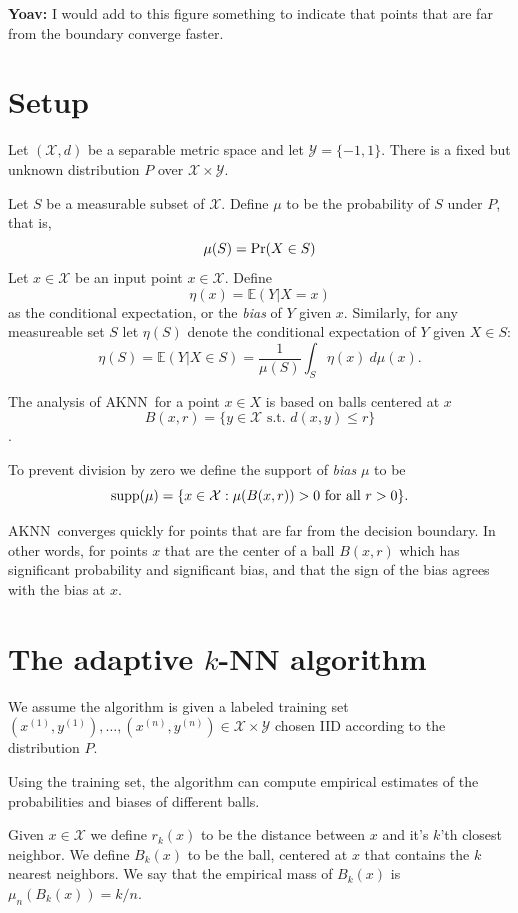 \documentclass{article}
\def\pr{{\rm Pr}}
\def\E{{\mathbb E}}
\def\X{{\mathcal X}}
\def\Y{{\mathcal Y}}
\def\supp{{\rm supp}}
\newcommand{\algname}{\textsc{AKNN}}
\begin{document}
{\bf Yoav:} I would add to this figure something to indicate that
points that are far from the boundary converge faster.

\section{Setup}

Let $(\X, d)$ be a separable metric space and let $\Y =
\{-1,1\}$. There is a fixed but unknown distribution $P$ over $\X \times \Y$.

Let $S$ be a measurable subset of $\X$.
Define $\mu$ to be the probability of $S$ under $P$, that is,
$$ \mu(S) = \pr(X \in S) $$
Let $x \in \X$ be an input point $x \in \X$. Define 
$$ \eta(x) = \E(Y| X = x)$$ as the conditional expectation, or the
{\em bias}  of $Y$ given $x$.
Similarly, for any measureable set $S$ let $\eta(S)$ denote the
conditional expectation of $Y$ given $X \in S$:
$$ \eta(S) = \E(Y| X \in S) = \frac{1}{\mu(S)} \int_S \eta(x) \ d \mu(x) .$$

The analysis of \algname\ for a point $x \in X$ is based on balls centered
at $x$ $$ B(x,r) = \{ y \in \X \mbox{ s.t. } d(x,y) \leq r \} $$.

To prevent division by zero we define the support of {\em bias} $\mu$ to be
$$ \supp(\mu) = \{x \in \X: \mbox{$\mu(B(x,r)) > 0$ for all $r > 0$}\} .$$

\algname\  converges quickly for points that are far
from the decision boundary. In other words, for points $x$ that are
the center of a ball $B(x,r)$ which has significant probability and
significant bias, and that the sign of the bias agrees with the bias
at $x$.

\section{The adaptive $k$-NN algorithm}
We assume the algorithm is given a labeled training set
$(x^{(1)}, y^{(1)}), \ldots, (x^{(n)}, y^{(n)}) \in \X \times \Y$
chosen IID according to the distribution $P$.

Using the training set, the algorithm can compute empirical estimates of the
probabilities and biases of different balls.

Given $x \in \X$ we define $r_k(x)$ to be the distance between $x$ and
it's $k$'th closest neighbor. We define $B_k(x)$ to be the ball,
centered at $x$ that contains the $k$ nearest neighbors. We say that
the empirical mass of $B_k(x)$ is $\mu_n(B_k(x)) = k/n$.
\end{document}
